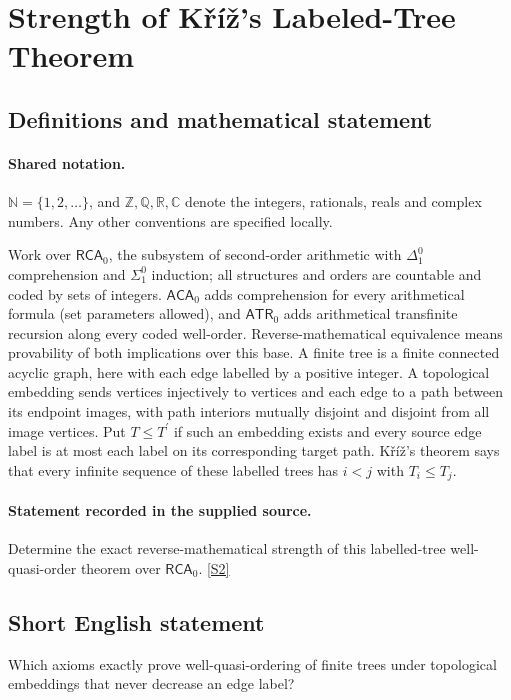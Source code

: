 \documentclass[11pt]{article}
\newcommand{\sref}[2]{\hyperlink{source:#1:#2}{[S#2]}}
\begin{document}
\section{Strength of Kříž's Labeled-Tree Theorem}\label{statement}

\subsection{Definitions and mathematical statement}

\paragraph{Shared notation.}$\mathbb N=\{1,2,\ldots\}$, and $\mathbb Z,\mathbb Q,\mathbb R,\mathbb C$ denote the integers, rationals, reals and complex numbers. Any other conventions are specified locally.


Work over $\mathsf{RCA}_0$, the subsystem of second-order arithmetic with $\Delta^0_1$ comprehension and $\Sigma^0_1$ induction; all structures and orders are countable and coded by sets of integers. $\mathsf{ACA}_0$ adds comprehension for every arithmetical formula (set parameters allowed), and $\mathsf{ATR}_0$ adds arithmetical transfinite recursion along every coded well-order. Reverse-mathematical equivalence means provability of both implications over this base. A finite tree is a finite connected acyclic graph, here with each edge labelled by a positive integer. A topological embedding sends vertices injectively to vertices and each edge to a path between its endpoint images, with path interiors mutually disjoint and disjoint from all image vertices. Put $T\le T^{\prime}$ if such an embedding exists and every source edge label is at most each label on its corresponding target path. Kříž's theorem says that every infinite sequence of these labelled trees has $i<j$ with $T_i\le T_j$.
\paragraph{Statement recorded in the supplied source.}
Determine the exact reverse-mathematical strength of this labelled-tree well-quasi-order theorem over $\mathsf{RCA}_0$. \sref{statement}{2}
\subsection{Short English statement}
Which axioms exactly prove well-quasi-ordering of finite trees under topological embeddings that never decrease an edge label?
\end{document}
